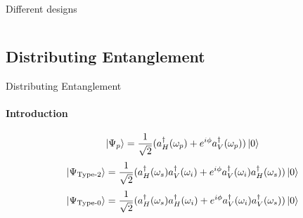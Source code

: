 \documentclass[serif,8pt]{beamer}
\begin{document}
\begin{frame}{Different designs}
\begin{columns}[t]
    \end{columns}
\end{frame}

\subsection{Distributing Entanglement}
\begin{frame}{Distributing Entanglement}
	\framesubtitle{Introduction}
	\begin{equation*}
		\ket{\Psi_{p}} = \frac{1}{\sqrt{2}} ( a_{H}^{\dagger} ( \omega_p ) + e^{i\phi} a_{V}^{\dagger} ( \omega_p ) )\ket{0}
	\end{equation*}
	\begin{equation*}
		\ket{\Psi_{\text{Type-2}}} = \frac{1}{\sqrt{2}}(a_{H}^{\dagger}(\omega_s)a_{V}^{\dagger}(\omega_i)+
							e^{i\phi} a_{V}^{\dagger}(\omega_i)a_{H}^{\dagger}(\omega_s))\ket{0}
	\end{equation*}
	\begin{equation*}
			\ket{\Psi_{\text{Type-0}}} = \frac{1}{\sqrt{2}}(a_{H}^{\dagger}(\omega_s)a_{H}^{\dagger}(\omega_i)+
									  e^{i\phi} a_{V}^{\dagger}(\omega_i)a_{V}^{\dagger}(\omega_s))\ket{0}
	\end{equation*}
\end{frame}
\end{document}
